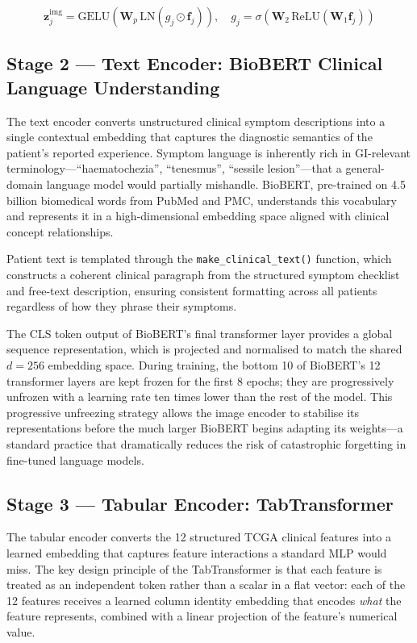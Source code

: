 \documentclass[conference]{IEEEtran}
\begin{document}
\begin{equation}
  \mathbf{z}_j^{\text{img}} = \text{GELU}(\mathbf{W}_p\,\text{LN}(g_j\odot\mathbf{f}_j)),
  \quad g_j = \sigma(\mathbf{W}_2\,\text{ReLU}(\mathbf{W}_1\mathbf{f}_j))
  \label{eq:img}
\end{equation}

\subsection{Stage 2 — Text Encoder: BioBERT Clinical Language Understanding}

The text encoder converts unstructured clinical symptom descriptions into a
single contextual embedding that captures the diagnostic semantics of the
patient's reported experience. Symptom language is inherently rich in
GI-relevant terminology---``haematochezia'', ``tenesmus'', ``sessile
lesion''---that a general-domain language model would partially mishandle.
BioBERT, pre-trained on 4.5 billion biomedical words from PubMed and PMC,
understands this vocabulary and represents it in a high-dimensional embedding
space aligned with clinical concept relationships.

Patient text is templated through the \texttt{make\_clinical\_text()} function,
which constructs a coherent clinical paragraph from the structured symptom
checklist and free-text description, ensuring consistent formatting across
all patients regardless of how they phrase their symptoms.

The CLS token output of BioBERT's final transformer layer provides a global
sequence representation, which is projected and normalised to match the shared
$d\!=\!256$ embedding space. During training, the bottom 10 of BioBERT's 12
transformer layers are kept frozen for the first 8 epochs; they are progressively
unfrozen with a learning rate ten times lower than the rest of the model.
This progressive unfreezing strategy allows the image encoder to stabilise
its representations before the much larger BioBERT begins adapting its
weights---a standard practice that dramatically reduces the risk of
catastrophic forgetting in fine-tuned language models.

\subsection{Stage 3 — Tabular Encoder: TabTransformer}

The tabular encoder converts the 12 structured TCGA clinical features into
a learned embedding that captures feature interactions a standard MLP would
miss. The key design principle of the TabTransformer \cite{huang2020} is that
each feature is treated as an independent token rather than a scalar in a flat
vector: each of the 12 features receives a learned column identity embedding
that encodes \textit{what} the feature represents, combined with a linear
projection of the feature's numerical value.
\end{document}
